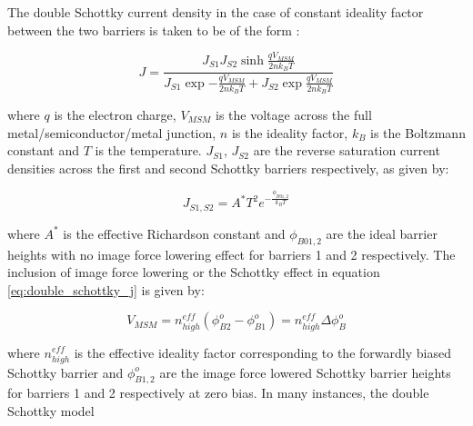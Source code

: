 \begin{refsection}
The double Schottky current density in the case of constant ideality factor between the two barriers is taken to be of the form \cite{Nouchi2014, Tang2006, Chiquito2012, Molinari2008}:

\begin{equation}
    J = \frac{J_{S1}J_{S2}\sinh{\frac{qV_{MSM}}{2nk_{B}T}}}{J_{S1}\exp{-\frac{qV_{MSM}}{2nk_{B}T}} + J_{S2}\exp{\frac{qV_{MSM}}{2nk_{B}T}}}
    \label{eq:double_schottky_j}
\end{equation}

\noindent where $q$ is the electron charge, $V_{MSM}$ is the voltage across the full metal/semiconductor/metal junction, $n$ is the ideality factor, $k_{B}$ is the Boltzmann constant and $T$ is the temperature. $J_{S1}$, $J_{S2}$ are the reverse saturation current densities across the first and second Schottky barriers respectively, as given by:

\begin{equation}
    J_{S1,S2} = A^{*}T^{2}e^{-\frac{\phi_{B01,2}}{k_{B}T}}
    \label{eq:reverse_saturation_j}
\end{equation}

\noindent where $A^{*}$ is the effective Richardson constant and $\phi_{B01,2}$ are the ideal barrier heights with no image force lowering effect for barriers 1 and 2 respectively. The inclusion of image force lowering or the Schottky effect \cite{Monch2004} in equation \ref{eq:double_schottky_j} is given by:

\begin{equation}
    V_{MSM} = n_{high}^{eff}\left(\phi_{B2}^{o}-\phi_{B1}^{o}\right) = n_{high}^{eff}\Delta\phi_{B}^{o}
    \label{eq:vmsm_correction}
\end{equation}

\noindent where $n_{high}^{eff}$ is the effective ideality factor corresponding to the forwardly biased Schottky barrier and $\phi_{B1,2}^{o}$ are the image force lowered Schottky barrier heights for barriers 1 and 2 respectively at zero bias. In many instances, the double Schottky model

\printbibliography[heading=subbibliography]

\end{refsection}